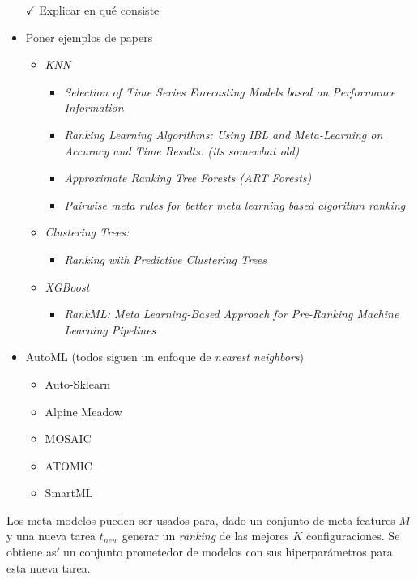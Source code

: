 \begin{itemize}
	\item[$\checkmark$] Explicar en qué consiste
	\item Poner ejemplos de papers
	\begin{itemize}
		\item \textit{KNN} 	
		\begin{itemize}
			\item \textit{Selection of Time Series Forecasting Models based on Performance Information}
			\item \textit{Ranking Learning Algorithms: Using IBL and Meta-Learning on Accuracy and Time Results. (its somewhat old)}
			\item \textit{Approximate Ranking Tree Forests (ART Forests)}
			\item \textit{Pairwise meta rules for better meta learning based algorithm ranking}	
		\end{itemize}
		\item \textit{Clustering Trees:}
		\begin{itemize}
			\item \textit{Ranking with Predictive Clustering Trees}
		\end{itemize}
		\item \textit{XGBoost}
		\begin{itemize}
			\item \textit{RankML: Meta Learning-Based Approach for Pre-Ranking Machine Learning Pipelines}
		\end{itemize}
	\end{itemize}
	\item AutoML (todos siguen un enfoque de \textit{nearest neighbors}) \begin{itemize}
		\item Auto-Sklearn
		\item Alpine Meadow
		\item MOSAIC
		\item ATOMIC
		\item SmartML
	\end{itemize}
\end{itemize}

\quad


Los meta-modelos pueden ser usados para, dado un conjunto de meta-features $M$ y una nueva tarea $t_{new}$ generar un \textit{ranking} de las mejores $K$ configuraciones. Se obtiene así un conjunto prometedor de modelos con sus hiperparámetros para esta nueva tarea.
 
